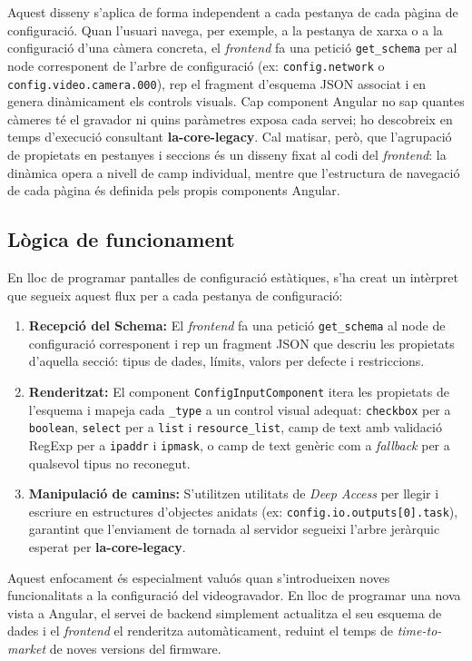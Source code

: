 Aquest disseny s'aplica de forma independent a cada pestanya de cada pàgina de configuració. Quan l'usuari navega, per exemple, a la pestanya de xarxa o a la configuració d'una càmera concreta, el \textit{frontend} fa una petició \texttt{get\_schema} per al node corresponent de l'arbre de configuració (ex: \texttt{config.network} o \texttt{config.video.camera.000}), rep el fragment d'esquema JSON associat i en genera dinàmicament els controls visuals. Cap component Angular no sap quantes càmeres té el gravador ni quins paràmetres exposa cada servei; ho descobreix en temps d'execució consultant \textbf{la-core-legacy}. Cal matisar, però, que l'agrupació de propietats en pestanyes i seccions és un disseny fixat al codi del \textit{frontend}: la dinàmica opera a nivell de camp individual, mentre que l'estructura de navegació de cada pàgina és definida pels propis components Angular.

\subsection{Lògica de funcionament}
En lloc de programar pantalles de configuració estàtiques, s'ha creat un intèrpret que segueix aquest flux per a cada pestanya de configuració:
\begin{enumerate}
    \item \textbf{Recepció del Schema:} El \textit{frontend} fa una petició \texttt{get\_schema} al node de configuració corresponent i rep un fragment JSON que descriu les propietats d'aquella secció: tipus de dades, límits, valors per defecte i restriccions.
    \item \textbf{Renderitzat:} El component \texttt{ConfigInputComponent} itera les propietats de l'esquema i mapeja cada \texttt{\_type} a un control visual adequat: \texttt{checkbox} per a \texttt{boolean}, \texttt{select} per a \texttt{list} i \texttt{resource\_list}, camp de text amb validació RegExp per a \texttt{ipaddr} i \texttt{ipmask}, o camp de text genèric com a \textit{fallback} per a qualsevol tipus no reconegut.
    \item \textbf{Manipulació de camins:} S'utilitzen utilitats de \textit{Deep Access} per llegir i escriure en estructures d'objectes anidats (ex: \texttt{config.io.outputs[0].task}), garantint que l'enviament de tornada al servidor segueixi l'arbre jeràrquic esperat per \textbf{la-core-legacy}.
\end{enumerate}

Aquest enfocament és especialment valuós quan s'introdueixen noves funcionalitats a la configuració del videogravador. En lloc de programar una nova vista a Angular, el servei de backend simplement actualitza el seu esquema de dades i el \textit{frontend} el renderitza automàticament, reduint el temps de \textit{time-to-market} de noves versions del firmware.


